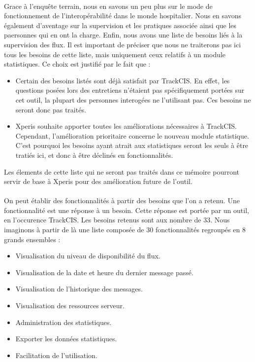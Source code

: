 			\paragraph{}%
			Grace à l'enquête terrain, nous en savons un peu plus sur le mode de
			fonctionnement de l'interopérabilité dans le monde hospitalier. Nous en
			savons également d'aventage sur la supervision et les pratiques associée
			ainsi que les paersonnes qui en ont la charge. Enfin, nous avons une liste de
			besoins liés à la supervision des flux. Il est important de préciser que
			nous ne traiterons pas ici tous les besoins de cette liste, mais uniquement
			ceux relatifs à un module statistiques.
			Ce choix est justifié par le fait que :
			\begin{itemize}
			  \item Certain des besoins listés sont déjà satisfait par TrackCIS. En
			  effet, les questions posées lors des entretiens n'étaient pas
			  spécifiquement portées sur cet outil, la plupart des personnes interogées
			  ne l'utilisant pas. Ces besoins ne seront donc pas traités.
			  \item Xperis souhaite apporter toutes les améliorations nécessaires à
			  TrackCIS. Cependant, l'amélioration prioritaire concerne le nouveau module
			  statistique. C'est pourquoi les besoins ayant atrait aux statistiques
			  seront les seuls à être tratiés ici, et donc à être déclinés en
			  fonctionnalités.
			\end{itemize}
			Les élements de cette liste qui ne seront pas traités dans ce mémoire
			pourront servir de base à Xperis pour des amélioration future de l'outil.
			
			\paragraph{}%
			On peut établir des fonctionnalités à partir des besoins que l'on a retenu.
			Une fonctionnalité est une réponse à un besoin. Cette réponse est portée par
			un outil, en l'occurence TrackCIS. Les besoins retenus sont aux nombre de 33.
			Nous imaginons à partir de là une liste composée de 30 fonctionnalités
			regroupés en 8 grands ensembles :
			\begin{itemize}
			  \item Visualisation du niveau de disponibilité du flux.
			  \item Visualisation de la date et heure du dernier message passé.
			  \item Visualisation de l’historique des messages.
			  \item Visualisation des ressources serveur.
			  \item Administration des statistiques.
			  \item Exporter les données statistiques.
			  \item Facilitation de l’utilisation.
			\end{itemize}
			
